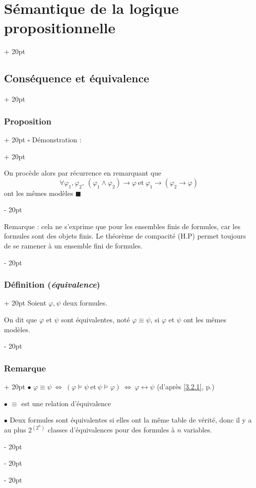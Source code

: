 \documentclass[a4paper, 12pt, twoside]{article}
\newcommand{\ssi}{\ \Leftrightarrow \ }
\newcommand{\ind}[1][20pt]{\advance\leftskip + #1}
\newcommand{\deind}[1][20pt]{\advance\leftskip - #1}
\newenvironment{indt}[2][20pt]{#2 \par \ind[#1]}{\par \deind} %
\begin{document}
\begin{indt}{\section{Sémantique de la logique propositionnelle}}
\begin{indt}{\subsection{Conséquence et équivalence}}
\begin{indt}{\subsubsection{Proposition}}
\begin{indt}{$\square$ Démonstration :}
                    \vspace{12pt}
                    
                    On procède alors par récurrence en remarquant que
                        \[ \forall \varphi_1, \varphi_2,\ (\varphi_1 \wedge \varphi_2) \rightarrow \varphi\ \text{et}\ \varphi_1 \rightarrow (\varphi_2 \rightarrow \varphi) \]
                    ont les mêmes modèles $\blacksquare$
                \end{indt}
                
                \vspace{12pt}
                
                Remarque : cela ne s'exprime que pour les ensembles finis de formules, car les formules sont des objets finis. Le théorème de compacité (H.P) permet toujours de se ramener à un ensemble fini de formules.
            \end{indt}
            
            \vspace{12pt}
            
            \begin{indt}{\subsubsection{Définition (\textit{équivalence})}}
                Soient $\varphi, \psi$ deux formules.
                
                On dit que $\varphi$ et $\psi$ sont équivalentes, noté $\varphi \equiv \psi$, si $\varphi$ et $\psi$ ont les mêmes modèles.
            \end{indt}
            
            \vspace{12pt}
            
            \begin{indt}{\subsubsection{Remarque}}
                $\bullet$ $\varphi \equiv \psi \ssi (\varphi \vDash \psi\ \text{et}\ \psi \vDash \varphi) \ssi \varphi \leftrightarrow \psi$ (d'après \ref{3.2.1}, p.\pageref{3.2.1})
                
                $\bullet$ $\equiv$ est une relation d'équivalence
                
                $\bullet$ Deux formules sont équivalentes si elles ont la même table de vérité, donc il y a au plus $2^{(2^n)}$ classes d'équivalences pour des formules à $n$ variables.
                

\end{indt}
\end{indt}
\end{indt}
\end{document}
